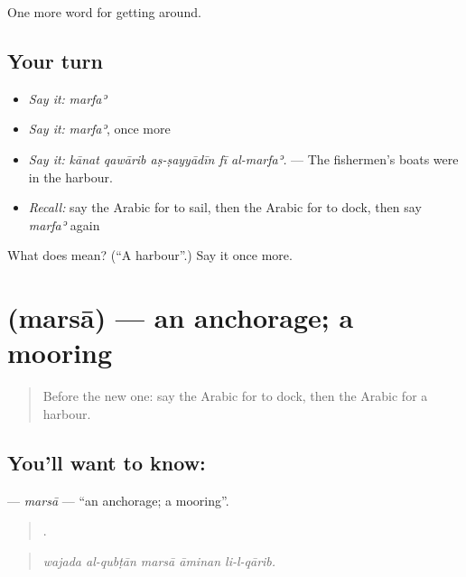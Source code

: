 \begin{grammarlens}[title={What you've built}]
One more word for getting around.
\end{grammarlens}

\subsection*{Your turn}
\begin{itemize}
\raggedright
  \item \emph{Say it:} \emph{marfaʾ}
  \item \emph{Say it:} \emph{marfaʾ}, once more
  \item \emph{Say it:} \emph{kānat qawārib aṣ-ṣayyādīn fī al-marfaʾ.} — The fishermen's boats were in the harbour.
  \item \emph{Recall:} say the Arabic for to sail, then the Arabic for to dock, then say \emph{marfaʾ} again
\end{itemize}

\begin{tcolorbox}[breakable,colback=teal!4,colframe=teal!35!black,title={Before you move on}]
What does  mean? (\textquotedblleft{}A harbour\textquotedblright{}.) Say it once more.
\end{tcolorbox}
\section[\texorpdfstring{\ar{مرسى} (marsā)}{مرسى (marsā)}]{ (marsā) — an anchorage; a mooring}

\label{lesson:AR-C430-marsa}



\begin{quote}
Before the new one: say the Arabic for to dock, then the Arabic for a harbour.
\end{quote}

\subsection*{You'll want to know: }
\textbf{} — \emph{marsā} — \textquotedblleft{}an anchorage; a mooring\textquotedblright{}.

\begin{quote}
    .
\end{quote}

\begin{quote}
\emph{wajada al-qubṭān marsā āminan li-l-qārib.}
\end{quote}

